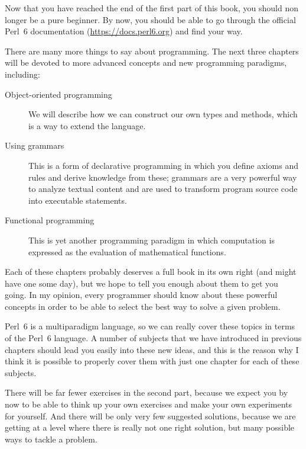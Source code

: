 %

Now that you have reached the end of the first part 
of this book, you should non longer be a pure beginner. 
By now, you should be able to go through the official 
Perl~6 documentation (\url{https://docs.perl6.org}) 
and find your way. 

There are many more things to say about programming. 
The next three chapters will be devoted to more 
advanced concepts and new programming paradigms, including:
\begin{description}

\item[Object-oriented programming] We will describe how 
we can construct our own types and methods, which 
is a way to extend the language.

\item[Using grammars] This is a form of declarative 
programming in which you define axioms and rules 
and derive knowledge from these; grammars are a 
very powerful way to analyze textual content and 
are used to transform program source code into 
executable statements.

\item[Functional programming] This is yet another programming 
paradigm in which computation is expressed as the 
evaluation of mathematical functions.
\end{description}

Each of these chapters probably deserves a full 
book in its own right (and might have one some day), 
but we hope to tell you enough about them to get you 
going. In my opinion, every programmer should know 
about these powerful concepts in order to be able 
to select the best way to solve a given problem.

Perl~6 is a multiparadigm language, so we can 
really cover these topics in terms of the Perl~6 
language. A number of subjects that we have 
introduced in previous chapters should lead you 
easily into these new ideas, and this is the 
reason why I think it is possible to properly cover 
them with just one chapter for each of these subjects.

There will be far fewer exercises in the second part, 
because we expect you by now to be able to think up 
your own exercises and make your own experiments for 
yourself. And there will be only very few suggested solutions, 
because we are getting at a level where there is really not  
one right solution, but many possible ways to tackle 
a problem.

